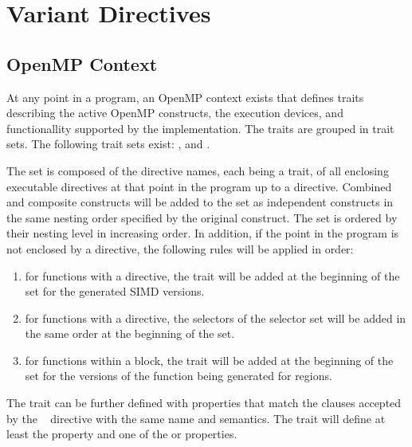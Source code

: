 \section{Variant Directives}
\label{sec:Variant Directives}

\subsection{OpenMP Context}
\label{subsec:OpenMP Context}

At any point in a program, an OpenMP context exists that defines traits describing the active OpenMP constructs, the execution devices, and functionallity supported by the implementation. The traits are grouped in trait sets. The following trait sets exist: ,  and .

The  set is composed of the directive names, each being a trait, of all enclosing executable directives at that point in the program up to a  directive. Combined and composite constructs will be added to the set as independent constructs in the same nesting order specified by the original construct. The set is ordered by their nesting level in increasing order. In addition, if the point in the program is not enclosed by a  directive, the following rules will be applied in order:
\begin{enumerate} 
 \item for functions with a  directive, the  trait will be added at the beginning of the set for the generated SIMD versions.  
 \item for functions with a  directive, the selectors of the  selector set will be added in the same order at the beginning of the set.
 \item for functions within a  block, the  trait will be added at the beginning of the set for the versions of the function being generated for  regions.
\end{enumerate}

The  trait can be further defined with properties that match the clauses accepted by the ~ directive with the same name and semantics. The  trait will define at least the  property and one of  the  or  properties.


